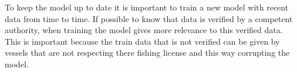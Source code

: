 To keep the model up to date it is important to train a new model with recent data from time to time. If possible to know that data is verified by a competent authority, when training the model gives more relevance to this verified data. This is important because the train data that is not verified can be given by vessels that are not respecting there fishing license and this way corrupting the model.






